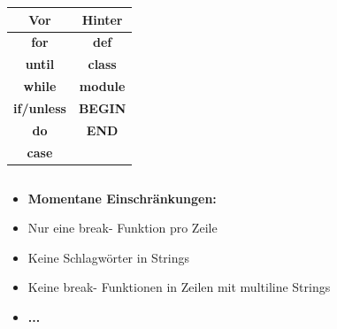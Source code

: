 \begin{frame}
	\begin{center}
		\begin{tabular}{c|c}
			\textbf{Vor} & \textbf{Hinter} \\ 
			\hline 
			\textbf{for} & \textbf{def} \\ 
			\textbf{until} & \textbf{class} \\
			\textbf{while} & \textbf{module} \\
			\textbf{if/unless} & \textbf{BEGIN} \\
			\textbf{do} & \textbf{END} \\
			\textbf{case} &  \\
		\end{tabular}
	\end{center}
\end{frame}

\begin{frame}
	\inputminted[linenos, frame=lines, label=Beispiel]{java}{scopes/beispiel.rb}
\end{frame}

\begin{frame}
	\begin{itemize}
		\item[]\textbf{Momentane Einschränkungen:}
		\item[]Nur eine break- Funktion pro Zeile
		\item[]Keine Schlagwörter in Strings
		\item[]Keine break- Funktionen in Zeilen mit multiline Strings
		\item[]\textbf{...}
	\end{itemize}
\end{frame}

